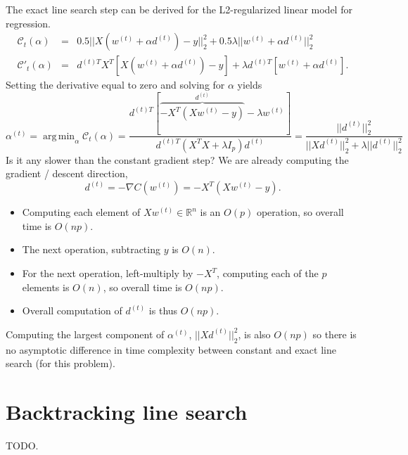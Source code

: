 \documentclass{article}
\DeclareMathOperator*{\argmin}{arg\,min}
\begin{document}
The exact line search step can be derived for the L2-regularized
linear model for regression.
\begin{eqnarray}
  \mathcal C_t(\alpha) &=& 0.5||X(w^{(t)} + \alpha d^{(t)}) -y||_2^2 +
 0.5\lambda||w^{(t)} + \alpha d^{(t)}||_2^2\\
  \mathcal C'_t(\alpha) &=& d^{(t) T} X^T [X(w^{(t)} + \alpha d^{(t)}) -y] +
\lambda d^{(t) T} [w^{(t)} + \alpha d^{(t)}].
\end{eqnarray}
Setting the derivative equal to zero and solving for $\alpha$ yields
\begin{equation}
  \alpha^{(t)} = \argmin_\alpha \mathcal C_t(\alpha) = 
\frac{
d^{(t) T} [ \overbrace{-X^T(Xw^{(t)}-y)}^{d^{(t)}} - \lambda w^{(t)} ]
}{
d^{(t) T} (X^T X + \lambda I_p) d^{(t)}
} = \frac{
||d^{(t)}||_2^2
}{
|| X d^{(t)} ||_2^2 + 
\lambda ||d^{(t)}||_2^2
}
\end{equation}
Is it any slower than the constant gradient step? We are already computing
the gradient / descent direction,
\begin{equation}
  d^{(t)} = -\nabla C(w^{(t)}) = -X^T(X w^{(t)} - y).
\end{equation}
\begin{itemize}
\item Computing each element of $X w^{(t)}\in\mathbb R^n$ is an $O(p)$
  operation, so overall time is $O(np)$.
\item The next operation, subtracting $y$ is $O(n)$.
\item For the next operation, left-multiply by $-X^T$, computing each
  of the $p$ elements is $O(n)$, so overall time is $O(np)$.
\item Overall computation of $d^{(t)}$ is thus $O(np)$.
\end{itemize}
Computing the largest component of $\alpha^{(t)}$, $||Xd^{(t)}||_2^2$,
is also $O(np)$ so there is no asymptotic difference in time
complexity between constant and exact line search (for this problem).

\section{Backtracking line search}

TODO.
\end{document}

